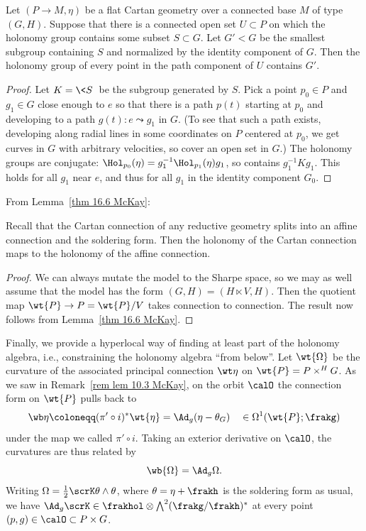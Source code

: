 \begin{thm}\label{thm 16.33 McKay}
    Let $(P\to M,\eta)$ be a flat Cartan geometry over a connected base $M$ of type $(G,H)$. Suppose that there is a connected open set $U\subset P$ on which the holonomy group contains some subset $S\subset G$. Let $G'< G$ be the smallest subgroup containing $S$ and normalized by the identity component of $G$. Then the holonomy group of every point in the path component of $U$ contains $G'$.
\end{thm}
\begin{proof}
    Let $K=\<S\>$ be the subgroup generated by $S$. Pick a point $p_0\in P$ and $g_1\in G$ close enough to $e$ so that there is a path $p(t)$ starting at $p_0$ and developing to a path $g(t):e\leadsto g_1$ in $G$. (To see that such a path exists, developing along radial lines in some coordinates on $P$ centered at $p_0$, we get curves in $G$ with arbitrary velocities, so cover an open set in $G$.) The holonomy groups are conjugate: $\Hol_{p_0}(\eta)=g_1^{-1}\Hol_{p_1}(\eta)g_1$, so contains $g_1^{-1}Kg_1$. This holds for all $g_1$ near $e$, and thus for all $g_1$ in the identity component $G_0$.
\end{proof}

From Lemma~\ref{thm 16.6 McKay}:

\begin{thm}
    Recall that the Cartan connection of any reductive geometry splits into an affine connection and the soldering form. Then the holonomy of the Cartan connection maps to the holonomy of the affine connection.
\end{thm}
\begin{proof}
    We can always mutate the model to the Sharpe space, so we may as well assume that the model has the form $(G,H)=(H\ltimes V,H)$. Then the quotient map $\wt{P}\to P=\wt{P}\slash V$ takes connection to connection. The result now follows from Lemma~\ref{thm 16.6 McKay}.
\end{proof}


Finally, we provide a hyperlocal way of finding at least part of the holonomy algebra, i.e., constraining the holonomy algebra ``from below''. Let $\wt{\Omega}$ be the curvature of the associated principal connection $\wt\eta$ on $\wt{P}=P\times^H G$. As we saw in Remark~\ref{rem lem 10.3 McKay}, on the orbit $\calO$ the connection form on $\wt{P}$ pulls back to 
\[\wb\eta\coloneqq (\pi'\circ i)^\ast \wt{\eta}= \Ad_g(\eta-\theta_G) \quad \in \Omega^1(\wt{P};\frakg)\]
under the map we called $\pi'\circ i$. Taking an exterior derivative on $\calO$, the curvatures are thus related by 
\[\wb{\Omega}=\Ad_g \Omega.\]
Writing $\Omega=\frac12\scrK \theta\wedge\theta$, where $\theta=\eta+\frakh$ is the soldering form as usual, we have $\Ad_g \scrK\in\frakhol \otimes\bigwedge^2(\frakg\slash\frakh)^\ast$ at every point $(p,g)\in \calO\subset P\times G$.


